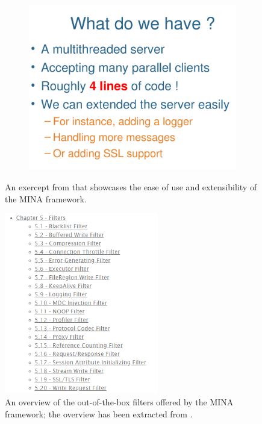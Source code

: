 \begin{figure}[H]
    \begin{subfigure}[b]{0.5\textwidth}
         \centering
         \includegraphics[width=\textwidth]{images/usability_extensibility.png}
     \end{subfigure}
    
    \caption{An exercept from \cite{mina-talk2009} that showcases the ease of use and extensibility of the MINA framework.}
    \label{fig:usability_extensibility}
\end{figure}

\begin{figure}[H]
    \centering
    \includegraphics[width=0.6\textwidth]{images/filters.png}
    \caption{An overview of the out-of-the-box filters offered by the MINA framework; the overview has been extracted from \cite{mina-userguide}.}
    \label{fig:filters}
\end{figure}

